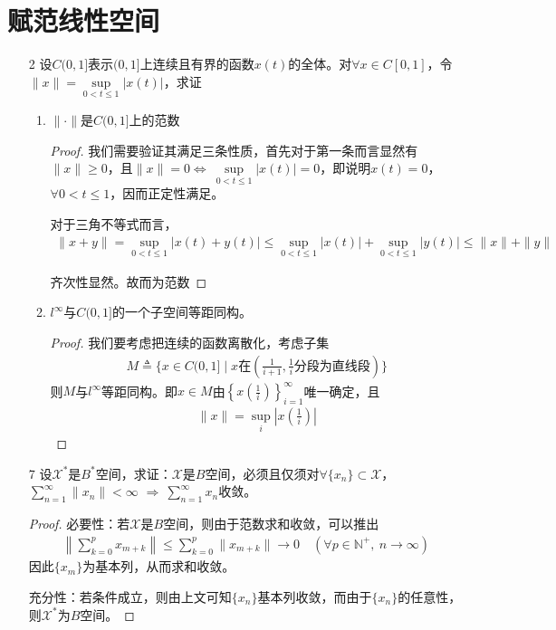 	\section{赋范线性空间}
	\begin{enumerate}[leftmargin=2cm, label=\arabic*]
		\item[2] 设$C(0,1]$表示$(0,1]$上连续且有界的函数$x(t)$的全体。对$\forall x\in C[0,1]$，令$\|x\| = \sup\limits_{0<t\leqslant 1} |x(t)|$，求证
		\begin{enumerate}[leftmargin=1cm, label=(\arabic*)]
			\item $\|\cdot\|$是$C(0,1]$上的范数
			\begin{proof}
				我们需要验证其满足三条性质，首先对于第一条而言显然有$\|x\|\geqslant 0$，且$\|x\| = 0 \Leftrightarrow\ \sup\limits_{0<t\leqslant 1} |x(t)| = 0$，即说明$x(t) = 0$，$\forall 0<t\leqslant 1$，因而正定性满足。
				
				对于三角不等式而言，
				\begin{align*}
					\|x+y\| = \sup\limits_{0<t\leqslant 1} |x(t) + y(t)| \leqslant \sup\limits_{0<t\leqslant 1} |x(t)| + \sup\limits_{0<t\leqslant 1} |y(t)| \leqslant \|x\| + \|y\|
				\end{align*}
				
				齐次性显然。故而为范数
			\end{proof}
			
			\item $l^{\infty}$与$C(0,1]$的一个子空间等距同构。
			\begin{proof}
				我们要考虑把连续的函数离散化，考虑子集
				\begin{align*}
					M \triangleq \{x\in C(0,1]\mid x\text{在}\left(\frac{1}{i+1},\frac{1}{i}\text{分段为直线段}\right) \}
				\end{align*}
				则$M$与$l^{\infty}$等距同构。即$x\in M$由$\left\lbrace x\left(\frac{1}{i}\right) \right\rbrace_{i=1}^{\infty}$唯一确定，且
				\begin{align*}
					\|x\| = \sup\limits_{i} \left| x\left(\frac{1}{i}\right) \right|
				\end{align*}
			\end{proof}
		\end{enumerate}
		
		\item[7] 设$\mathscr{X}^*$是$B^*$空间，求证：$\mathscr{X}$是$B$空间，必须且仅须对$\forall \{x_n\}\subset\mathscr{X}$，$\sum\limits_{n=1}^{\infty}\|x_n\| < \infty$ $\Rightarrow\ \sum\limits_{n=1}^{\infty} x_n$收敛。
		\begin{proof}
			必要性：若$\mathscr{X}$是$B$空间，则由于范数求和收敛，可以推出
			\begin{align*}
				\left\|\sum\limits_{k=0}^p x_{m+k} \right\| \leqslant \sum\limits_{k=0}^p \|x_{m+k}\| \to 0 \quad (\forall p\in\mathbb{N}^+,\ n\to\infty)
			\end{align*}
			因此$\{x_m\}$为基本列，从而求和收敛。
			
			充分性：若条件成立，则由上文可知$\{x_n\}$基本列收敛，而由于$\{x_n\}$的任意性，则$\mathscr{X}^*$为$B$空间。
		\end{proof}
	\end{enumerate}
	
